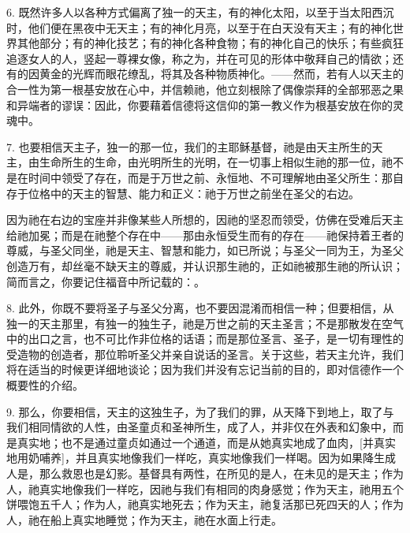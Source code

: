 6. 既然许多人以各种方式偏离了独一的天主，有的神化太阳，以至于当太阳西沉时，他们便在黑夜中无天主；有的神化月亮，以至于在白天没有天主；有的神化世界其他部分；有的神化技艺；有的神化各种食物；有的神化自己的快乐；有些疯狂追逐女人的人，竖起一尊裸女像，称之为，并在可见的形体中敬拜自己的情欲；还有的因黄金的光辉而眼花缭乱，将其及各种物质神化。——然而，若有人以天主的合一性为第一根基安放在心中，并信赖祂，他立刻根除了偶像崇拜的全部邪恶之果和异端者的谬误：因此，你要藉着信德将这信仰的第一教义作为根基安放在你的灵魂中。\par

\par

7. 也要相信天主子，独一的那一位，我们的主耶稣基督，祂是由天主所生的天主，由生命所生的生命，由光明所生的光明，在一切事上相似生祂的那一位，祂不是在时间中领受了存在，而是于万世之前、永恒地、不可理解地由圣父所生：那自存于位格中的天主的智慧、能力和正义：祂于万世之前坐在圣父的右边。\par

因为祂在右边的宝座并非像某些人所想的，因祂的坚忍而领受，仿佛在受难后天主给祂加冕；而是在祂整个存在中——那由永恒受生而有的存在——祂保持着王者的尊威，与圣父同坐，祂是天主、智慧和能力，如已所说；与圣父一同为王，为圣父创造万有，却丝毫不缺天主的尊威，并认识那生祂的，正如祂被那生祂的所认识；简而言之，你要记住福音中所记载的：。\par

8. 此外，你既不要将圣子与圣父分离，也不要因混淆而相信一种；但要相信，从独一的天主那里，有独一的独生子，祂是万世之前的天主圣言；不是那散发在空气中的出口之言，也不可比作非位格的话语；而是那位圣言、圣子，是一切有理性的受造物的创造者，那位聆听圣父并亲自说话的圣言。关于这些，若天主允许，我们将在适当的时候更详细地谈论；因为我们并没有忘记当前的目的，即对信德作一个概要性的介绍。\par

\par

9. 那么，你要相信，天主的这独生子，为了我们的罪，从天降下到地上，取了与我们相同情欲的人性，由圣童贞和圣神所生，成了人，并非仅在外表和幻象中，而是真实地；也不是通过童贞如通过一个通道，而是从她真实地成了血肉，[并真实地用奶哺养]，并且真实地像我们一样吃，真实地像我们一样喝。因为如果降生成人是，那么救恩也是幻影。基督具有两性，在所见的是人，在未见的是天主；作为人，祂真实地像我们一样吃，因祂与我们有相同的肉身感觉；作为天主，祂用五个饼喂饱五千人；作为人，祂真实地死去；作为天主，祂复活那已死四天的人；作为人，祂在船上真实地睡觉；作为天主，祂在水面上行走。\par

